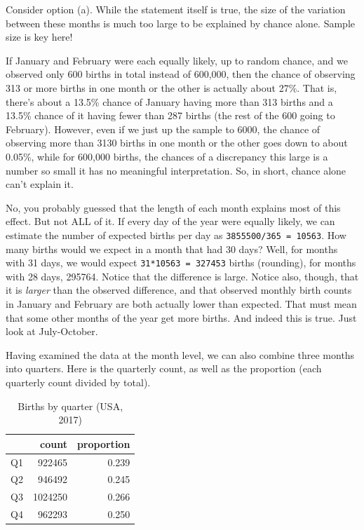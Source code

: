 \documentclass[
  openany]{book}
\begin{document}
Consider option (a). While the statement itself is true, the size of the variation between these months is much too large to be explained by chance alone. Sample size is key here!

If January and February were each equally likely, up to random chance, and we observed only 600 births in total instead of 600,000, then the chance of observing 313 or more births in one month or the other is actually about 27\%. That is, there's about a 13.5\% chance of January having more than 313 births and a 13.5\% chance of it having fewer than 287 births (the rest of the 600 going to February). However, even if we just up the sample to 6000, the chance of observing more than 3130 births in one month or the other goes down to about 0.05\%, while for 600,000 births, the chances of a discrepancy this large is a number so small it has no meaningful interpretation. So, in short, chance alone can't explain it.

No, you probably guessed that the length of each month explains most of this effect. But not ALL of it. If every day of the year were equally likely, we can estimate the number of expected births per day as \texttt{3855500/365\ =\ 10563}. How many births would we expect in a month that had 30 days? Well, for months with 31 days, we would expect \texttt{31*10563\ =\ 327453} births (rounding), for months with 28 days, 295764. Notice that the difference is large. Notice also, though, that it is \emph{larger} than the observed difference, and that observed monthly birth counts in January and February are both actually lower than expected. That must mean that some other months of the year get more births. And indeed this is true. Just look at July-October.

Having examined the data at the month level, we can also combine three months into quarters. Here is the quarterly count, as well as the proportion (each quarterly count divided by total).

\begin{table}[!h]

\caption{\label{tab:birthquarter}Births by quarter (USA, 2017)}
\centering
\begin{tabular}[t]{lrr}
\toprule
  & count & proportion\\
\midrule
Q1 & 922465 & 0.239\\
Q2 & 946492 & 0.245\\
Q3 & 1024250 & 0.266\\
Q4 & 962293 & 0.250\\
\bottomrule
\end{tabular}
\end{table}
\end{document}
